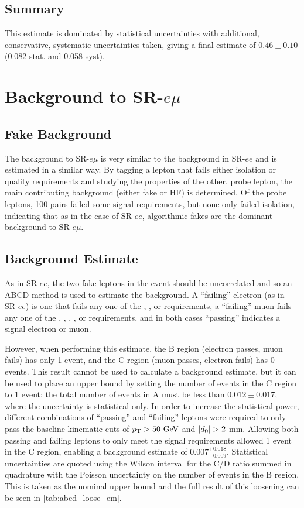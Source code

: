 \subsection{Summary}

This estimate is dominated by statistical uncertainties with additional, conservative, systematic uncertainties taken, giving a final estimate of $0.46 \pm 0.10$ (0.082 stat. and 0.058 syst).

\section{Background to SR-$e\mu$}

\subsection{Fake Background}
The background to SR-$e\mu$ is very similar to the background in SR-$ee$ and is estimated in a similar way. By tagging a lepton that fails either isolation or quality requirements and studying the properties of the other, probe lepton, the main contributing background (either fake or \ac{HF}) is determined. Of the probe leptons, 100 pairs failed some signal requirements, but none only failed isolation, indicating that as in the case of SR-$ee$, algorithmic fakes are the dominant background to SR-$e\mu$. 

\subsection{Background Estimate}
As in SR-$ee$, the two fake leptons in the event should be uncorrelated and so an ABCD method is used to estimate the background. A ``failing'' electron (as in SR-$ee$) is one that fails any one of the \dpt, \chiID, or \nmiss requirements, a ``failing'' muon fails any one of the  \chiID, \chiCB, \nmiss, \nprecision, or \nphi requirements, and in both cases ``passing'' indicates a signal electron or muon.

However, when performing this estimate, the B region (electron passes, muon fails) has only 1 event, and the C region (muon passes, electron fails) has 0 events. This result cannot be used to calculate a background estimate, but it can be used to place an upper bound by setting the number of events in the C region to 1 event: the total number of events in A must be less than $0.012 \pm 0.017$, where the uncertainty is statistical only. In order to increase the statistical power, different combinations of ``passing'' and ``failing'' leptons were required to only pass the baseline kinematic cuts of $\pt > 50 \GeV$ and $|d_0| > 2$ mm. Allowing both passing and failing leptons to only meet the signal requirements allowed 1 event in the C region, enabling a background estimate of $0.007^{+0.018}_{-0.009}$. Statistical uncertainties are quoted using the Wilson interval for the C/D ratio summed in quadrature with the Poisson uncertainty on the number of events in the B region. This is taken as the nominal upper bound and the full result of this loosening can be seen in \autoref{tab:abcd_loose_em}.


